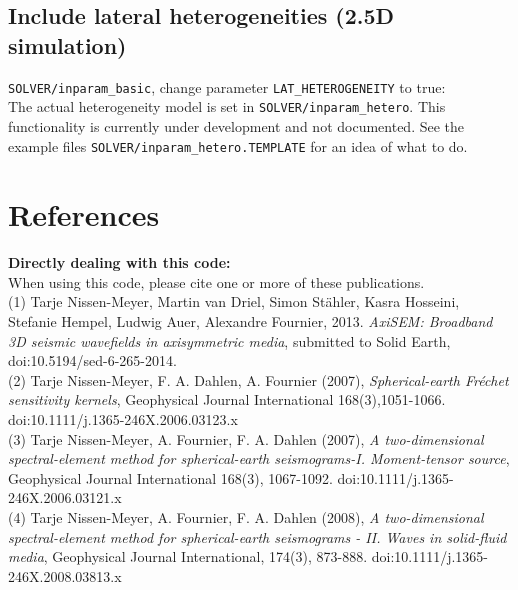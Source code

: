 \documentclass{article}
\begin{document}
\subsection{Include lateral heterogeneities (2.5D simulation)}
\verb|SOLVER/inparam_basic|, change parameter \verb|LAT_HETEROGENEITY| to true:\\
The actual heterogeneity model is set in \verb|SOLVER/inparam_hetero|. 
This functionality is currently under development and not documented. See the example files \verb|SOLVER/inparam_hetero.TEMPLATE| for an idea of what to do.



\newpage
\section{References}

\noindent \textbf{Directly dealing with this code:}\vspace*{0.2cm}\\
When using this code, please cite one or more of these publications. \vspace*{0.2cm}\\


(1) Tarje Nissen-Meyer, Martin van Driel, Simon St\"ahler, Kasra Hosseini,
Stefanie Hempel, Ludwig Auer, Alexandre Fournier, 2013. \textit{AxiSEM: Broadband 3D
seismic wavefields in axisymmetric media}, submitted to Solid Earth,
doi:10.5194/sed-6-265-2014.\\

(2) Tarje Nissen-Meyer, F. A. Dahlen, A. Fournier (2007),
\textit{Spherical-earth Fr\'{e}chet sensitivity kernels},        
Geophysical Journal International 168(3),1051-1066. 
doi:10.1111/j.1365-246X.2006.03123.x                \\
                                                        
(3) Tarje Nissen-Meyer, A. Fournier, F. A. Dahlen (2007), 
\textit{A two-dimensional spectral-element method for
spherical-earth seismograms-I. Moment-tensor source}, 
Geophysical Journal International 168(3), 1067-1092. 
doi:10.1111/j.1365-246X.2006.03121.x                 \\
                                                       
(4) Tarje Nissen-Meyer, A. Fournier, F. A. Dahlen (2008),  
\textit{A two-dimensional spectral-element method for   
spherical-earth seismograms - II. Waves in solid-fluid media},
Geophysical Journal International, 174(3), 873-888.
doi:10.1111/j.1365-246X.2008.03813.x\\
\end{document}
